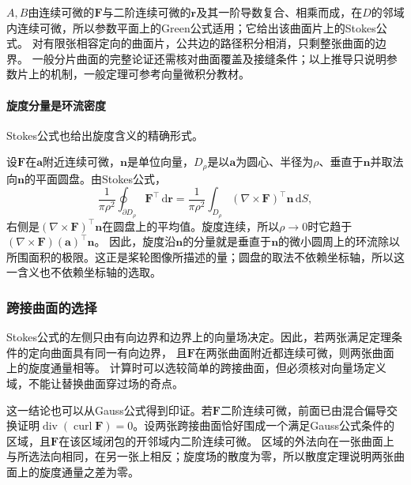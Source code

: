 $A,B$由连续可微的$\bm F$与二阶连续可微的$\bm r$及其一阶导数复合、相乘而成，在$D$的邻域内连续可微，所以参数平面上的Green公式适用；它给出该曲面片上的Stokes公式。
对有限张相容定向的曲面片，公共边的路径积分相消，只剩整张曲面的边界。
一般分片曲面的完整论证还需核对曲面覆盖及接缝条件；以上推导只说明参数片上的机制，一般定理可参考向量微积分教材。

\paragraph{旋度分量是环流密度}

Stokes公式也给出旋度含义的精确形式。

设$\bm F$在$\bm a$附近连续可微，$\bm n$是单位向量，$D_\rho$是以$\bm a$为圆心、半径为$\rho$、垂直于$\bm n$并取法向$\bm n$的平面圆盘。由Stokes公式，
\[
 \frac1{\pi\rho^2}\oint_{\partial D_\rho}\bm F^\top\,\mathrm d\bm r
 =\frac1{\pi\rho^2}\int_{D_\rho}(\nabla\times\bm F)^\top\bm n\,\mathrm dS,
\]
右侧是$(\nabla\times\bm F)^\top\bm n$在圆盘上的平均值。旋度连续，所以$\rho\to0$时它趋于$(\nabla\times\bm F)(\bm a)^\top\bm n$。
因此，旋度沿$\bm n$的分量就是垂直于$\bm n$的微小圆周上的环流除以所围面积的极限。这正是桨轮图像所描述的量；圆盘的取法不依赖坐标轴，所以这一含义也不依赖坐标轴的选取。

\subsubsection{跨接曲面的选择}

Stokes公式的左侧只由有向边界和边界上的向量场决定。因此，若两张满足定理条件的定向曲面具有同一有向边界，
且$\bm F$在两张曲面附近都连续可微，则两张曲面上的旋度通量相等。
计算时可以选较简单的跨接曲面，但必须核对向量场定义域，不能让替换曲面穿过场的奇点。

这一结论也可以从Gauss公式得到印证。若$\bm F$二阶连续可微，前面已由混合偏导交换证明$\operatorname{div}(\operatorname{curl}\bm F)=0$。设两张跨接曲面恰好围成一个满足Gauss公式条件的区域，且$\bm F$在该区域闭包的开邻域内二阶连续可微。
区域的外法向在一张曲面上与所选法向相同，在另一张上相反；旋度场的散度为零，所以散度定理说明两张曲面上的旋度通量之差为零。

